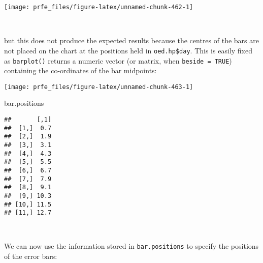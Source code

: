 \documentclass[
  12pt,
  a4paper]{book}
\newenvironment{Shaded}{\begin{snugshade}}{\end{snugshade}}
\newcommand{\AttributeTok}[1]{\textcolor[rgb]{0.77,0.63,0.00}{#1}}
\newcommand{\DecValTok}[1]{\textcolor[rgb]{0.00,0.00,0.81}{#1}}
\newcommand{\FloatTok}[1]{\textcolor[rgb]{0.00,0.00,0.81}{#1}}
\newcommand{\FunctionTok}[1]{\textcolor[rgb]{0.00,0.00,0.00}{#1}}
\newcommand{\NormalTok}[1]{#1}
\newcommand{\OtherTok}[1]{\textcolor[rgb]{0.56,0.35,0.01}{#1}}
\newcommand{\SpecialCharTok}[1]{\textcolor[rgb]{0.00,0.00,0.00}{#1}}
\newcommand{\StringTok}[1]{\textcolor[rgb]{0.31,0.60,0.02}{#1}}
\begin{document}
\begin{center}\texttt{[image: prfe\_files/figure-latex/unnamed-chunk-462-1]} \end{center}

~

but this does not produce the expected results because the centres of the bars are not placed on the chart at the positions held in \texttt{oed.hp\$day}. This is easily fixed as \texttt{barplot()} returns a numeric vector (or matrix, when \texttt{beside\ =\ TRUE}) containing the co-ordinates of the bar midpoints:

\newpage

\begin{Shaded}
\end{Shaded}

\begin{center}\texttt{[image: prfe\_files/figure-latex/unnamed-chunk-463-1]} \end{center}

\begin{Shaded}
\begin{Highlighting}[]
\NormalTok{bar.positions}
\end{Highlighting}
\end{Shaded}

\begin{verbatim}
##       [,1]
##  [1,]  0.7
##  [2,]  1.9
##  [3,]  3.1
##  [4,]  4.3
##  [5,]  5.5
##  [6,]  6.7
##  [7,]  7.9
##  [8,]  9.1
##  [9,] 10.3
## [10,] 11.5
## [11,] 12.7
\end{verbatim}

~

We can now use the information stored in \texttt{bar.positions} to specify the positions of the error bars:

~

\begin{Shaded}
\end{Shaded}
\end{document}
